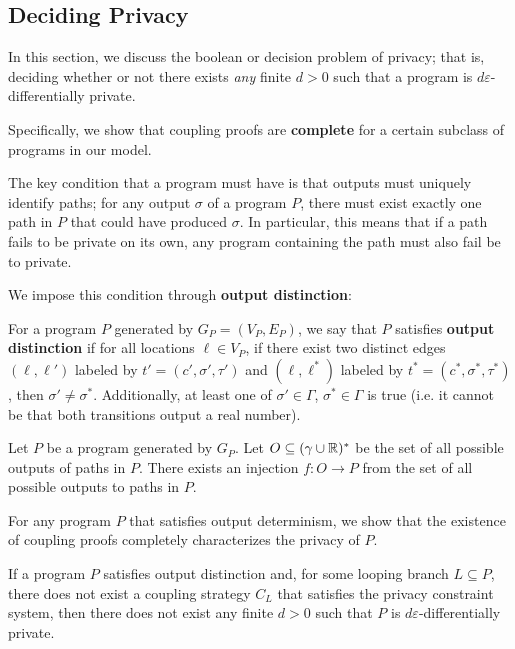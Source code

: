 \subsection{Deciding Privacy}

In this section, we discuss the boolean or decision problem of privacy; that is, deciding whether or not there exists \textit{any} finite $d>0$ such that a program is $d\varepsilon$-differentially private.

Specifically, we show that coupling proofs are \textbf{complete} for a certain subclass of programs in our model.

The key condition that a program must have is that outputs must uniquely identify paths; for any output $\sigma$ of a program $P$, there must exist exactly one path in $P$ that could have produced $\sigma$. In particular, this means that if a path fails to be private on its own, any program containing the path must also fail be to private. 

We impose this condition through \textbf{output distinction}:

\begin{defn}\label{outputDistinctionDef}
    For a program $P$ generated by $G_P = (V_P, E_P)$, we say that $P$ satisfies \textbf{output distinction} if for all locations $\ell\in V_P$, if there exist two distinct edges $(\ell, \ell')$ labeled by $t'=(c', \sigma', \tau')$ and $(\ell, \ell^*)$ labeled by $t^* = (c^*, \sigma^*, \tau^*)$, then $\sigma' \neq \sigma^*$. Additionally, at least one of $\sigma'\in \Gamma$, $\sigma^*\in \Gamma$ is true (i.e. it cannot be that both transitions output a real number).
\end{defn}

\begin{prop}
    Let $P$ be a program generated by $G_P$. Let $O\subseteq (\gamma\cup \mathbb{R})^*$ be the set of all possible outputs of paths in $P$. There exists an injection $f: O\to P$ from the set of all possible outputs to paths in $P$. 
\end{prop}

For any program $P$ that satisfies output determinism, we show that the existence of coupling proofs completely characterizes the privacy of $P$.

\begin{lemma}\label{ProgramCounterexampleLemma}
    If a program $P$ satisfies output distinction and, for some looping branch $L\subseteq P$, there does not exist a coupling strategy $C_L$ that satisfies the privacy constraint system, then there does not exist any finite $d>0$ such that $P$ is $d\varepsilon$-differentially private.
\end{lemma}

